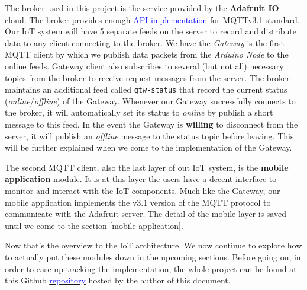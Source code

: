 The broker used in this project is the service provided by the \textbf{Adafruit IO} cloud. The broker provides enough \href{https://io.adafruit.com/api/docs/mqtt.html#adafruit-io-mqtt-api}{\textcolor{blue}{API implementation}} for MQTTv3.1 standard. Our IoT system will have 5 separate feeds on the server to record and distribute data to any client connecting to the broker. We have the \textit{Gateway} is the first MQTT client by which we publish data packets from the \textit{Arduino Node} to the online feeds. Gateway client also subscribes to several (but not all) necessary topics from the broker to receive request messages from the server. The broker maintains an additional feed called \texttt{gtw-status} that record the current status (\textit{online}/\textit{offline}) of the Gateway. Whenever our Gateway successfully connects to the broker, it will automatically set its status to \textit{online} by publish a short message to this feed. In the event the Gateway is \textbf{willing} to disconnect from the server, it will publish an \textit{offline} message to the status topic before leaving. This will be further explained when we come to the implementation of the Gateway.

The second MQTT client, also the last layer of out IoT system, is the \textbf{mobile application}  module. It is at this layer the users have a decent interface to monitor and interact with the IoT components. Much like the Gateway, our mobile application implements the v3.1 version of the MQTT protocol to communicate with the Adafruit server. The detail of the mobile layer is saved until we come to the section \ref{mobile-application}.

Now that's the overview to the IoT architecture. We now continue to explore how to actually put these modules down in the upcoming sections. Before going on, in order to ease up tracking the implementation, the whole project can be found at this Github \href{https://github.com/hescul/adafruit-simple-iot}{\textcolor{blue}{repository}} hosted by the author of this document.
\clearpage